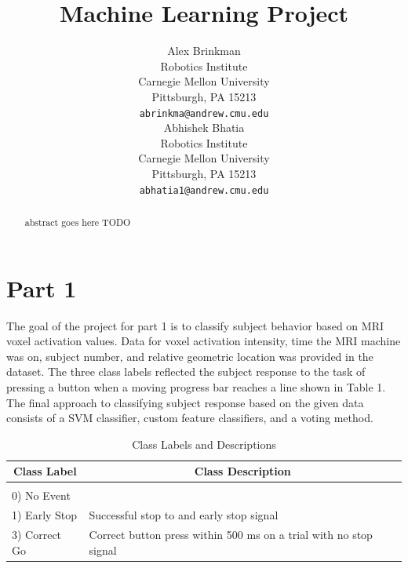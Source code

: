 \documentclass{article} %
\title{Machine Learning Project}
\author{
Alex Brinkman\\
Robotics Institute\\
Carnegie Mellon University\\
Pittsburgh, PA 15213 \\
\texttt{abrinkma@andrew.cmu.edu} \\
\And
Abhishek Bhatia \\
Robotics Institute \\
Carnegie Mellon University\\
Pittsburgh, PA 15213 \\
\texttt{abhatia1@andrew.cmu.edu} \\
}
\begin{document}
\maketitle

\begin{abstract}
abstract goes here TODO

\end{abstract}

\section{Part 1}
The goal of the project for part 1 is to classify subject behavior based on MRI voxel activation values. Data for voxel activation intensity, time the MRI machine was on, subject number, and relative geometric location was provided in the dataset. The three class labels reflected the subject response to the task of pressing a button when a moving progress bar reaches a line shown in Table 1. The final approach to classifying subject response based on the given data consists of a SVM classifier, custom feature classifiers, and a voting method. 

\begin{table}[h]
\caption{Class Labels and Descriptions}
\label{classtable}
\begin{center}
	\begin{tabular}{ll}
		\multicolumn{1}{c}{\bf Class Label}  &\multicolumn{1}{c}{\bf Class Description}
		\\ \hline \\
		0) No Event   &       \\
		1) Early Stop   &Successful stop to and early stop signal \\
		3) Correct Go		&Correct button press within 500 ms on a trial with no stop signal\\
	\end{tabular}
\end{center}
\end{table}  
\end{document}
